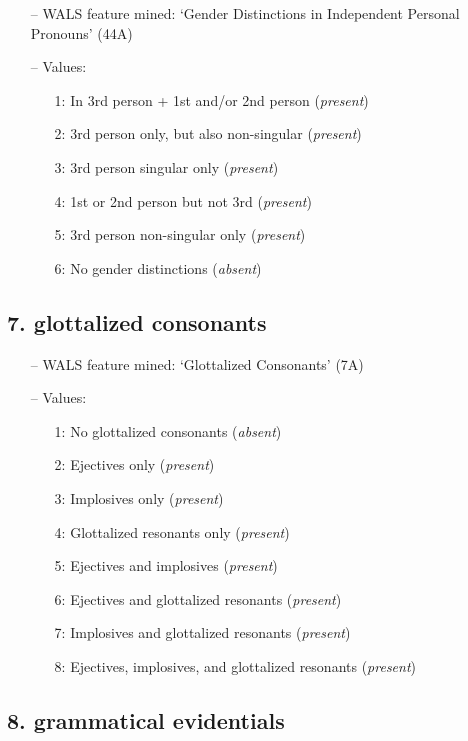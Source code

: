 \begin{itemize}
\item[--] WALS feature mined: `Gender Distinctions in Independent Personal Pronouns' (44A)
\item[--] Values:

\begin{enumerate}
\item[1:] In 3rd person + 1st and/or 2nd person (\emph{present})
\item[2:] 3rd person only, but also non-singular (\emph{present})
\item[3:] 3rd person singular only (\emph{present})
\item[4:] 1st or 2nd person but not 3rd (\emph{present})
\item[5:] 3rd person non-singular only (\emph{present})
\item[6:] No gender distinctions (\emph{absent})
\end{enumerate}
\end{itemize}

\subsection*{7. glottalized consonants}

\begin{itemize}
\item[--] WALS feature mined: `Glottalized Consonants' (7A)
\item[--] Values:

\begin{enumerate}
\item[1:] No glottalized consonants (\emph{absent})
\item[2:] Ejectives only (\emph{present})
\item[3:] Implosives only (\emph{present})
\item[4:] Glottalized resonants only (\emph{present})
\item[5:] Ejectives and implosives (\emph{present})
\item[6:] Ejectives and glottalized resonants (\emph{present})
\item[7:] Implosives and glottalized resonants (\emph{present})
\item[8:] Ejectives, implosives, and glottalized resonants (\emph{present})
\end{enumerate}
\end{itemize}

\subsection*{8. grammatical evidentials}

